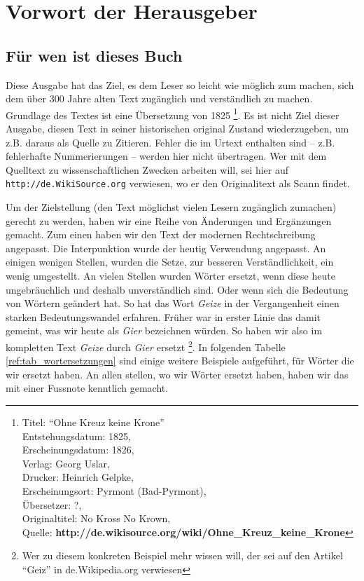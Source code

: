 \part{Vorwort der Herausgeber}

\chapter{Für wen ist dieses Buch}

Diese Ausgabe hat das Ziel, es dem Leser so leicht wie möglich zum machen, sich
dem über 300 Jahre alten Text zugänglich und verständlich zu machen. Grundlage
des Textes ist eine Übersetzung von 1825 \footnote{
Titel: "`Ohne Kreuz keine Krone"' \\
Entstehungsdatum: 1825, \\
Erscheinungsdatum: 1826, \\
Verlag: Georg Uslar, \\
Drucker: Heinrich Gelpke, \\
Erscheinungsort: Pyrmont (Bad-Pyrmont),\\
Übersetzer: ?, \\
Originaltitel: No Kross No Krown, \\
Quelle: \textbf{http://de.wikisource.org/wiki/Ohne\_Kreuz\_keine\_Krone}}. Es
ist nicht Ziel dieser Ausgabe, diesen Text in seiner historischen original
Zustand wiederzugeben, um z.B. daraus als Quelle zu Zitieren. Fehler die im
Urtext enthalten sind -- z.B. fehlerhafte Nummerierungen -- werden hier nicht
übertragen. Wer mit dem Quelltext zu wissenschaftlichen Zwecken arbeiten will,
sei hier auf \texttt{http://de.WikiSource.org} verwiesen, wo er den
Originalitext als Scann findet.

\medskip

Um der Zielstellung (den Text möglichst vielen Lesern zugänglich zumachen)
gerecht zu werden, haben wir eine Reihe von Änderungen und Ergänzungen gemacht.
Zum einen haben wir den Text der modernen Rechtschreibung angepasst. Die
Interpunktion wurde der heutig Verwendung angepasst. An einigen wenigen Stellen,
wurden die Setze, zur besseren Verständlichkeit, ein wenig umgestellt. An vielen
Stellen wurden Wörter ersetzt, wenn diese heute ungebräuchlich und deshalb
unverständlich sind. Oder wenn sich die Bedeutung von Wörtern geändert hat. So
hat das Wort \textit{Geize} in der Vergangenheit einen starken Bedeutungswandel
erfahren. Früher war in erster Linie das damit gemeint, was wir heute als
\textit{Gier} bezeichnen würden. So haben wir also im kompletten Text
\textit{Geize} durch \textit{Gier} ersetzt \footnote{Wer zu diesem konkreten
Beispiel mehr wissen will, der sei auf den Artikel "`Geiz"' in de.Wikipedia.org
verwiesen}. In folgenden Tabelle \ref{ref:tab_wortersetzungen} sind einige
weitere Beispiele aufgeführt, für Wörter die wir ersetzt haben. An allen
stellen, wo wir Wörter ersetzt haben, haben wir das mit einer Fussnote kenntlich
gemacht.

